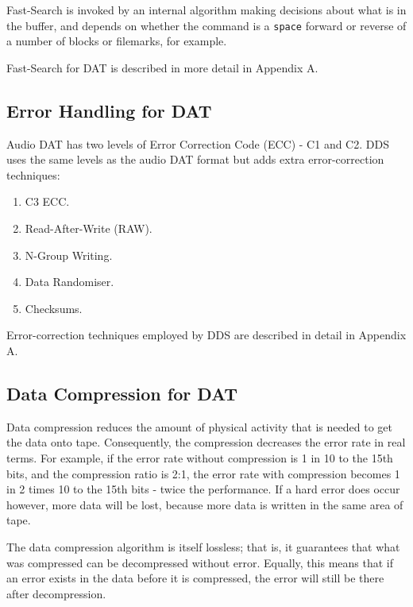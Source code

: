 \documentclass[11pt]{article}
\begin{document}
Fast-Search is invoked by an internal algorithm making decisions about what
is in the buffer, and depends on whether the command is a {\tt space} forward
or reverse of a number of blocks or filemarks, for example.

Fast-Search for DAT is described in more detail in Appendix A.

\subsection {Error Handling for DAT}

Audio DAT has two levels of Error Correction Code (ECC) - C1 and C2. DDS
uses the same levels as the audio DAT format but adds extra error-correction
techniques:

\begin {enumerate}

\item C3 ECC.

\item Read-After-Write (RAW).

\item N-Group Writing.

\item Data Randomiser.

\item Checksums.

\end {enumerate}

Error-correction techniques employed by DDS are described in detail in
Appendix A.

\subsection {Data Compression for DAT}

Data compression reduces the amount of physical activity that is needed to
get the data onto tape. Consequently, the compression decreases the error
rate in real terms. For example, if the error rate without compression is
1 in 10 to the 15th bits, and the compression ratio is 2:1, the error rate
with compression becomes 1 in 2 times 10 to the 15th bits - twice the
performance. If a hard error does occur however, more data will be lost,
because more data is written in the same area of tape.

The data compression algorithm is itself lossless; that is, it guarantees
that what was compressed can be decompressed without error. Equally, this
means that if an error exists in the data before it is compressed, the error
will still be there after decompression.
\end{document}
